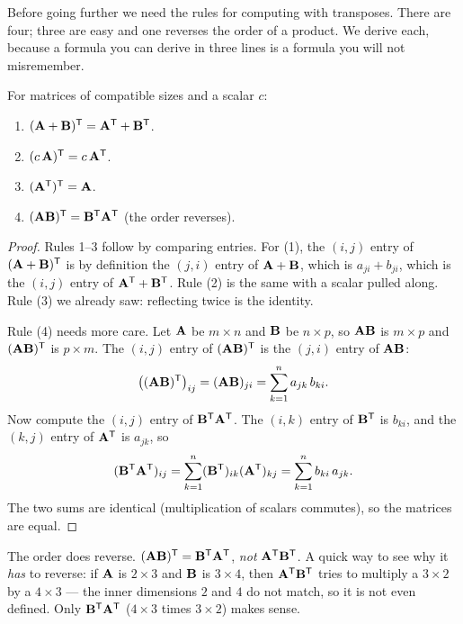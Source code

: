 Before going further we need the rules for computing with transposes. There are four; three are
easy and one reverses the order of a product. We derive each, because a formula you can
derive in three lines is a formula you will not misremember.

\begin{theorem}\label{ch10:thm-rules}
For matrices of compatible sizes and a scalar $c$:
\begin{enumerate}
  \item $(\mathbf{A}+\mathbf{B})^{\mathsf{T}} = \mathbf{A}^{\mathsf{T}} + \mathbf{B}^{\mathsf{T}}$.
  \item $(c\,\mathbf{A})^{\mathsf{T}} = c\,\mathbf{A}^{\mathsf{T}}$.
  \item $(\mathbf{A}^{\mathsf{T}})^{\mathsf{T}} = \mathbf{A}$.
  \item $(\mathbf{A}\mathbf{B})^{\mathsf{T}} = \mathbf{B}^{\mathsf{T}}\mathbf{A}^{\mathsf{T}}$ \quad(the order reverses).
\end{enumerate}
\end{theorem}

\begin{proof}
Rules 1--3 follow by comparing entries. For (1), the $(i,j)$ entry of $(\mathbf{A}+\mathbf{B})^{\mathsf{T}}$ is by definition the
$(j,i)$ entry of $\mathbf{A}+\mathbf{B}$, which is $a_{ji}+b_{ji}$, which is the $(i,j)$ entry of
$\mathbf{A}^{\mathsf{T}}+\mathbf{B}^{\mathsf{T}}$. Rule (2) is the same with a scalar pulled along. Rule (3) we already saw:
reflecting twice is the identity.

Rule (4) needs more care. Let $\mathbf{A}$ be $m\times n$ and $\mathbf{B}$ be $n\times p$,
so $\mathbf{A}\mathbf{B}$ is $m\times p$ and $(\mathbf{A}\mathbf{B})^{\mathsf{T}}$ is $p\times m$. The $(i,j)$ entry of
$(\mathbf{A}\mathbf{B})^{\mathsf{T}}$ is the $(j,i)$ entry of $\mathbf{A}\mathbf{B}$:
\[
  \big((\mathbf{A}\mathbf{B})^{\mathsf{T}}\big)_{ij}
  = (\mathbf{A}\mathbf{B})_{ji}
  = \sum_{k=1}^{n} a_{jk}\, b_{ki}.
\]
Now compute the $(i,j)$ entry of $\mathbf{B}^{\mathsf{T}}\mathbf{A}^{\mathsf{T}}$. The $(i,k)$ entry of $\mathbf{B}^{\mathsf{T}}$ is $b_{ki}$,
and the $(k,j)$ entry of $\mathbf{A}^{\mathsf{T}}$ is $a_{jk}$, so
\[
  (\mathbf{B}^{\mathsf{T}}\mathbf{A}^{\mathsf{T}})_{ij}
  = \sum_{k=1}^{n} (\mathbf{B}^{\mathsf{T}})_{ik}(\mathbf{A}^{\mathsf{T}})_{kj}
  = \sum_{k=1}^{n} b_{ki}\, a_{jk}.
\]
The two sums are identical (multiplication of scalars commutes), so the matrices are equal.
\end{proof}

\begin{trapbox}
The order does reverse. $(\mathbf{A}\mathbf{B})^{\mathsf{T}} = \mathbf{B}^{\mathsf{T}}\mathbf{A}^{\mathsf{T}}$, \emph{not}
$\mathbf{A}^{\mathsf{T}}\mathbf{B}^{\mathsf{T}}$. A quick way to see why it \emph{has} to reverse: if $\mathbf{A}$ is $2\times 3$ and
$\mathbf{B}$ is $3\times 4$, then $\mathbf{A}^{\mathsf{T}}\mathbf{B}^{\mathsf{T}}$ tries to multiply a $3\times 2$ by a $4\times 3$ ---
the inner dimensions $2$ and $4$ do not match, so it is not even defined. Only $\mathbf{B}^{\mathsf{T}}\mathbf{A}^{\mathsf{T}}$
($4\times 3$ times $3\times 2$) makes sense.
\end{trapbox}

